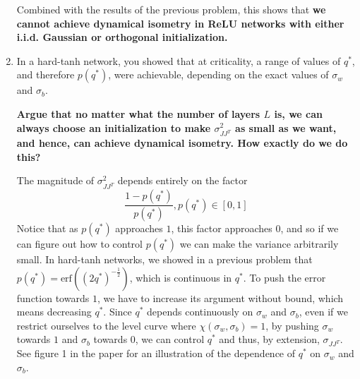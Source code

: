 \documentclass[a4paper]{article}
\begin{document}
\begin{enumerate}[label=(\alph*)]
\begin{tcolorbox}
    Combined with the results of the previous problem, this shows that \textbf{we cannot achieve dynamical isometry in ReLU networks with either i.i.d. Gaussian or orthogonal initialization.}
    \end{tcolorbox}
    
    \item In a hard-tanh network, you showed that at criticality, a range of values of $q^*$, and therefore $p(q^*)$, were achievable, depending on the exact values of $\sigma_w$ and $\sigma_b$.  
    
    \textbf{Argue that no matter what the number of layers $L$ is, we can always choose an initialization to make $\sigma_{JJ^T}^2$ as small as we want, and hence, can achieve dynamical isometry.  How exactly do we do this?}
    \begin{tcolorbox}
     The magnitude of $\sigma_{JJ^T}^2$ depends entirely on the factor
     $$ \frac{1 - p(q^*)}{p(q^*)}, p(q^*) \in [0, 1] $$
     Notice that as $p(q^*)$ approaches $1$, this factor approaches 0, and so if we can figure out how to control $p(q^*)$ we can make the variance arbitrarily small. In hard-tanh networks, we showed in a previous problem that $p(q^*) = \text{erf}\left( (2 q^*)^{-\frac{1}{2}}\right)$, which is continuous in $q^*$. To push the error function towards $1$, we have to increase its argument without bound, which means decreasing $q^*$. Since $q^*$ depends continuously on $\sigma_w$ and $\sigma_b$, even if we restrict ourselves to the level curve where $\chi(\sigma_w, \sigma_b) = 1$, by pushing $\sigma_w$ towards $1$ and $\sigma_b$ towards $0$, we can control $q^*$ and thus, by extension, $\sigma_{JJ^T}$. See figure 1 in the paper for an illustration of the dependence of $q^*$ on $\sigma_w$ and $\sigma_b$.
    \end{tcolorbox}
\end{enumerate}
\end{document}
